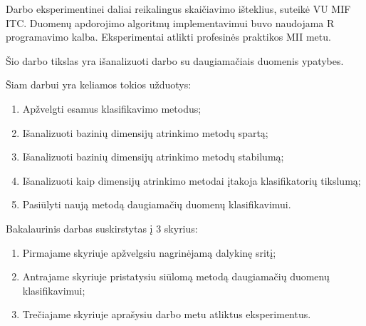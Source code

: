 Darbo eksperimentinei daliai reikalingus skaičiavimo išteklius, suteikė VU MIF 
ITC. Duomenų apdorojimo algoritmų implementavimui buvo naudojama R programavimo
kalba. Eksperimentai atlikti profesinės praktikos MII metu.

Šio darbo tikslas yra išanalizuoti darbo su daugiamačiais duomenis ypatybes.

Šiam darbui yra keliamos tokios užduotys:
\begin{enumerate}
 \item Apžvelgti esamus klasifikavimo metodus;
 \item Išanalizuoti bazinių dimensijų atrinkimo metodų spartą;
 \item Išanalizuoti bazinių dimensijų atrinkimo metodų stabilumą;
 \item Išanalizuoti kaip dimensijų atrinkimo metodai įtakoja klasifikatorių
 tikslumą;
 \item Pasiūlyti naują metodą daugiamačių duomenų klasifikavimui.
\end{enumerate}

Bakalaurinis darbas suskirstytas į 3 skyrius:
\begin{enumerate}
 \item Pirmajame skyriuje apžvelgsiu nagrinėjamą dalykinę sritį;
 \item Antrajame skyriuje pristatysiu siūlomą metodą daugiamačių duomenų 
 klasifikavimui;
 \item Trečiajame skyriuje aprašysiu darbo metu atliktus eksperimentus.
\end{enumerate}

